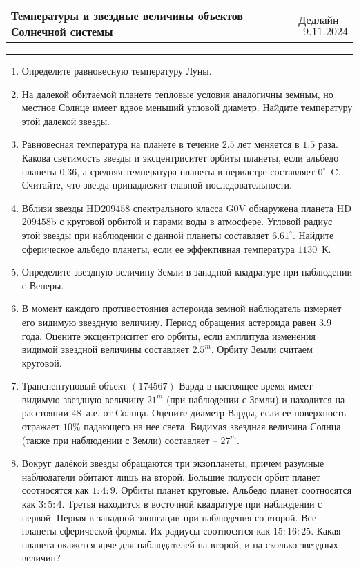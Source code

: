\documentclass[12pt]{article}
\begin{document}
 \begin{tabularx}{\textwidth}{Xr}
  {\Large \textbf{Температуры и звездные величины объектов Солнечной системы}} & Дедлайн -- $9.11.2024$ \\
 \end{tabularx}
 \noindent\rule{\textwidth}{0.4pt}
 \begin{enumerate}
        \item Определите равновесную температуру Луны.
        \item На далекой обитаемой планете тепловые условия аналогичны земным, но местное Солнце имеет вдвое меньший угловой диаметр. Найдите температуру этой далекой звезды.
        \item Равновесная температура на планете в течение $2.5$ лет меняется в $1.5$ раза. Какова светимость звезды и эксцентриситет орбиты планеты, если альбедо планеты $0.36$, а средняя температура планеты в периастре составляет $0^{\circ}$~C. Считайте, что звезда принадлежит главной последовательности.
        \item Вблизи звезды HD$209458$ спектрального класса G$0$V обнаружена планета HD$209458$b с круговой орбитой и парами воды в атмосфере. Угловой радиус этой звезды при наблюдении с данной планеты составляет $6.61^{\circ}$. Найдите сферическое альбедо планеты, если ее эффективная температура $1130$~К.
        \item Определите звездную величину Земли в западной квадратуре при наблюдении с Венеры.
        \item В момент каждого противостояния астероида земной наблюдатель измеряет его видимую звездную величину. Период обращения астероида равен $3.9$ года. Оцените эксцентриситет его орбиты, если амплитуда изменения видимой звездной величины составляет $2.5^m$. Орбиту Земли считаем круговой.
        \item Транснептуновый объект $(174567)$ Варда в настоящее время имеет видимую звездную	величину $21^m$ (при наблюдении с Земли) и находится на расстоянии $48$~а.е. от Солнца.	Оцените диаметр Варды, если ее поверхность отражает $10\%$ падающего на нее света. Видимая звездная величина Солнца (также при наблюдении с Земли) составляет -- $27^m$.
        \item Вокруг далёкой звезды обращаются три экзопланеты, причем разумные наблюдатели обитают лишь на второй. Большие полуоси орбит планет соотносятся как $1:4:9$. Орбиты планет круговые. Альбедо планет соотносятся как $3:5:4$. Третья находится в восточной квадратуре при наблюдении с первой. Первая в западной элонгации при наблюдения со второй. Все планеты сферической формы. Их радиусы соотносятся как $15:16:25$. Какая планета окажется ярче для наблюдателей на второй, и на сколько звездных величин?
 \end{enumerate}
\end{document}
